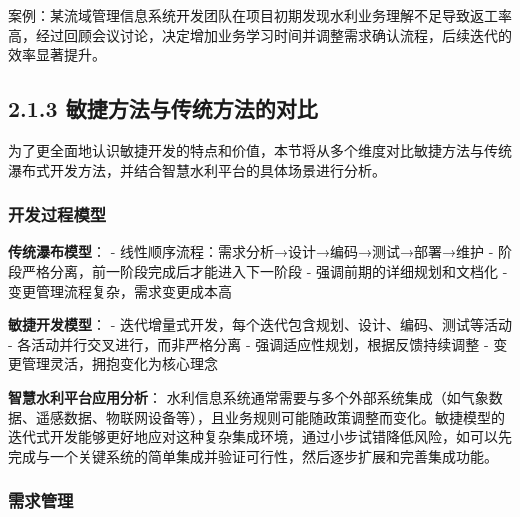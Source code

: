 案例：某流域管理信息系统开发团队在项目初期发现水利业务理解不足导致返工率高，经过回顾会议讨论，决定增加业务学习时间并调整需求确认流程，后续迭代的效率显著提升。

\subsection{2.1.3
敏捷方法与传统方法的对比}\label{ux654fux6377ux65b9ux6cd5ux4e0eux4f20ux7edfux65b9ux6cd5ux7684ux5bf9ux6bd4}

为了更全面地认识敏捷开发的特点和价值，本节将从多个维度对比敏捷方法与传统瀑布式开发方法，并结合智慧水利平台的具体场景进行分析。

\subsubsection{开发过程模型}\label{ux5f00ux53d1ux8fc7ux7a0bux6a21ux578b}

\textbf{传统瀑布模型}： -
线性顺序流程：需求分析→设计→编码→测试→部署→维护 -
阶段严格分离，前一阶段完成后才能进入下一阶段 -
强调前期的详细规划和文档化 - 变更管理流程复杂，需求变更成本高

\textbf{敏捷开发模型}： -
迭代增量式开发，每个迭代包含规划、设计、编码、测试等活动 -
各活动并行交叉进行，而非严格分离 - 强调适应性规划，根据反馈持续调整 -
变更管理灵活，拥抱变化为核心理念

\textbf{智慧水利平台应用分析}：
水利信息系统通常需要与多个外部系统集成（如气象数据、遥感数据、物联网设备等），且业务规则可能随政策调整而变化。敏捷模型的迭代式开发能够更好地应对这种复杂集成环境，通过小步试错降低风险，如可以先完成与一个关键系统的简单集成并验证可行性，然后逐步扩展和完善集成功能。

\subsubsection{需求管理}\label{ux9700ux6c42ux7ba1ux7406}

